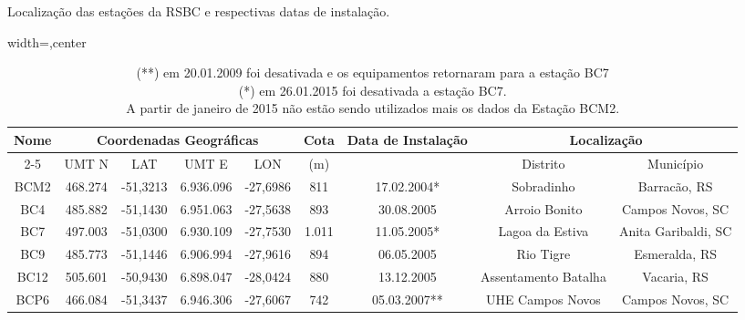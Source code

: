 \begin{table}[h!]
\begin{small}
\centering
    \captionsetup{justification=justified,singlelinecheck=false}
    \caption{Localização das estações da RSBC e respectivas datas de instalação.}
    \begin{adjustbox}{width=\textwidth,center}
    \begin{tabular}{|c|c|c|c|c|c|c|c|c|}
        \hline
        \multirow{2}{*}{Nome}
            & \multicolumn{4}{c|}{Coordenadas Geográficas}
            & \multirow{2}{*}{Cota} & \multirow{2}{*}{Data de Instalação} 
            & \multicolumn{2}{c|}{Localização} \\
            \cline{2-5}
            \cline{8-9}
            & UMT N  &  LAT & UMT E & LON & (m) && Distrito & Município \\
        \hline
        BCM2 & 468.274 & -51,3213 & 6.936.096 & -27,6986 & 811 & 17.02.2004* & Sobradinho & Barracão, RS\\
        \hline
        BC4 & 485.882 & -51,1430 & 6.951.063 & -27,5638 & 893 & 30.08.2005 & Arroio Bonito & Campos Novos, SC \\
        \hline
        BC7 & 497.003 & -51,0300 & 6.930.109 & -27,7530 & 1.011 & 11.05.2005* & Lagoa da Estiva & Anita Garibaldi, SC \\
        \hline
        BC9 & 485.773 & -51,1446 & 6.906.994 & -27,9616 & 894 & 06.05.2005 & Rio Tigre & Esmeralda, RS \\
        \hline
        BC12 & 505.601 & -50,9430 & 6.898.047 & -28,0424 & 880 & 13.12.2005 & Assentamento Batalha & Vacaria, RS \\
        \hline
        BCP6 & 466.084 & -51,3437 & 6.946.306 & -27,6067 & 742 & 05.03.2007** & UHE Campos Novos & Campos Novos, SC \\
        \hline
    \end{tabular}
    \end{adjustbox}
    \caption*{(**) em 20.01.2009 foi desativada e os equipamentos retornaram para a estação BC7 \\
    (*) em 26.01.2015 foi desativada a estação BC7.\\
    A partir de janeiro de 2015 não estão sendo utilizados mais os dados da Estação BCM2.
    }
\end{small}
\end{table}

